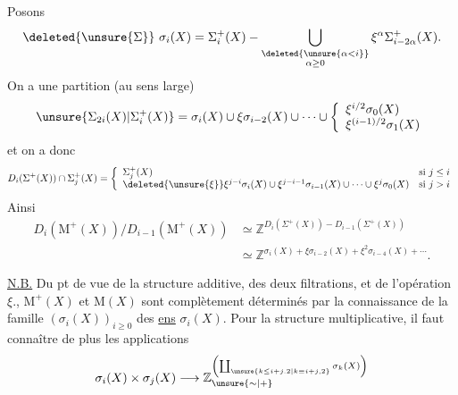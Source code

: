Posons
\[
\deleted{\unsure{\Sigma}}\ \sigma_i(X)=
\Sigma_i^+(X)-\bigcup_{\substack{\deleted{\unsure{\alpha<i}}\\\alpha\geq0}}
\xi^\alpha\Sigma_{i-2\alpha}^+(X).
\]
On a une partition (au sens large)
\[
\unsure{\Sigma_{2i}(X)|\Sigma_i^+(X)}
=\sigma_i(X)\cup\xi\sigma_{i-2}(X)\cup\cdots\cup
\left\{\begin{array}{l}
\xi^{i/2}\sigma_0(X)\\
\xi^{(i-1)/2}\sigma_1(X)
\end{array}\right.
\]
et on a donc
\[
D_i(\Sigma^+(X))\cap\Sigma_j^+(X)=
\left\{\begin{array}{ll}
\Sigma_j^+(X)&\text{si }j\leq i\\
\deleted{\unsure{\xi}}\xi^{j-i}\sigma_i(X)\cup
\xi^{j-i-1}\sigma_{i-1}(X)\cup\cdots\cup\xi^j\sigma_0(X)
&\text{si }j>i
\end{array}\right.
\]
Ainsi
\[
\begin{aligned}
D_i(\mathrm{M}^+(X))/D_{i-1}(\mathrm{M}^+(X))
&\simeq\mathbb{Z}^{D_i(\Sigma^+(X))-D_{i-1}(\Sigma^+(X))}\\
&\simeq\mathbb{Z}^{\sigma_i(X)+\xi\sigma_{i-2}(X)+\xi^2\sigma_{i-4}(X)+\cdots}.
\end{aligned}
\]

\uline{N.B.} Du pt de vue de la structure additive,
des deux filtrations, et de l'opération
$\xi.$, $\mathrm{M}^+(X)$ et $\mathrm{M}(X)$ sont complètement
déterminés par la connaissance de
la famille $(\sigma_i(X))_{i\geq0}$ des \uline{ens} $\sigma_i(X)$.
Pour la structure multiplicative, il faut
connaître de plus les applications
\[
\sigma_i(X)\times\sigma_j(X)\longrightarrow
\mathbb{Z}_{\unsure{\sim|+}}^{\left(\coprod_{\unsure{k\leq i+j.2|k\equiv i+j,2}}
\sigma_k(X)\right)}
\]
